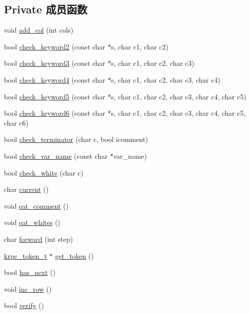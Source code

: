 \subsection*{Private 成员函数}
\begin{DoxyCompactItemize}
\item 
void \hyperlink{classkrpc__lexer__t_ab28dc24940e8cf45fb2f7220cc28b3f6}{add\+\_\+col} (int cols)
\item 
bool \hyperlink{classkrpc__lexer__t_a73ed4d367a4a544cf8a09e1ac62486a6}{check\+\_\+keyword2} (const char $\ast$s, char c1, char c2)
\item 
bool \hyperlink{classkrpc__lexer__t_a1a5593113b358e867a840892e79bd080}{check\+\_\+keyword3} (const char $\ast$s, char c1, char c2, char c3)
\item 
bool \hyperlink{classkrpc__lexer__t_a05efd992603a36720d6ef982dfbf2caa}{check\+\_\+keyword4} (const char $\ast$s, char c1, char c2, char c3, char c4)
\item 
bool \hyperlink{classkrpc__lexer__t_a6332f12a493d28168117a2c68381437c}{check\+\_\+keyword5} (const char $\ast$s, char c1, char c2, char c3, char c4, char c5)
\item 
bool \hyperlink{classkrpc__lexer__t_a0ee172be08d531266ae54d38b3344d6d}{check\+\_\+keyword6} (const char $\ast$s, char c1, char c2, char c3, char c4, char c5, char c6)
\item 
bool \hyperlink{classkrpc__lexer__t_ab8f823eb4debb2a2d655398ee57d268f}{check\+\_\+terminator} (char c, bool icomment)
\item 
bool \hyperlink{classkrpc__lexer__t_a8eca34404a5f28dae0854b9102925106}{check\+\_\+var\+\_\+name} (const char $\ast$var\+\_\+name)
\item 
bool \hyperlink{classkrpc__lexer__t_af12313c32b3d32c7b5743f2683af9eea}{check\+\_\+white} (char c)
\item 
char \hyperlink{classkrpc__lexer__t_ab43dfafd882bdd29eb3e86527ecf1a96}{current} ()
\item 
void \hyperlink{classkrpc__lexer__t_aac9c4da23c68633eb36a4f1ad1a2eace}{eat\+\_\+comment} ()
\item 
void \hyperlink{classkrpc__lexer__t_a70bc40fc4b1b9f89050e1af7e452409f}{eat\+\_\+whites} ()
\item 
char \hyperlink{classkrpc__lexer__t_aa53d78a1c216f17be7fa4589bda3d751}{forward} (int step)
\item 
\hyperlink{classkrpc__token__t}{krpc\+\_\+token\+\_\+t} $\ast$ \hyperlink{classkrpc__lexer__t_a11855adc8ca66763b315ee6c4f57a00c}{get\+\_\+token} ()
\item 
bool \hyperlink{classkrpc__lexer__t_aa0ff97d948e1a549665d5dcc64a193cf}{has\+\_\+next} ()
\item 
void \hyperlink{classkrpc__lexer__t_aae9633b064a078139fadcd1740bfff7a}{inc\+\_\+row} ()
\item 
bool \hyperlink{classkrpc__lexer__t_a8af5038360da3cdd202091591ffde915}{verify} ()
\end{DoxyCompactItemize}

